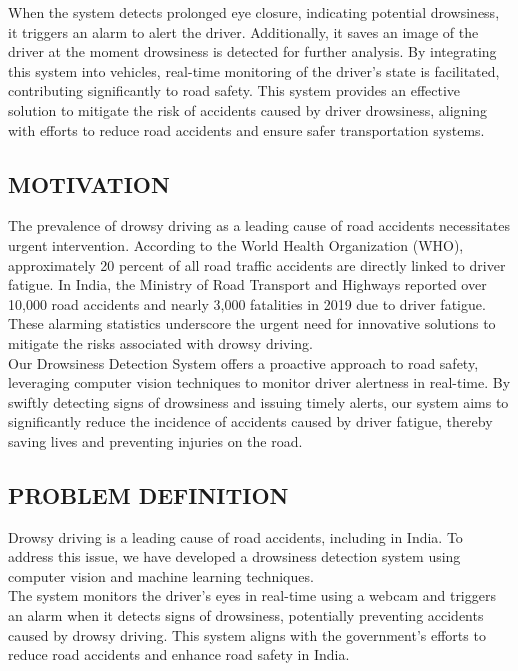 \documentclass[12pt]{article}
\begin{document}
When the system detects prolonged eye closure, indicating potential drowsiness, it triggers an alarm to alert the driver. Additionally, it saves an image of the driver at the moment drowsiness is detected for further analysis. By integrating this system into vehicles, real-time monitoring of the driver's state is facilitated, contributing significantly to road safety. This system provides an effective solution to mitigate the risk of accidents caused by driver drowsiness, aligning with efforts to reduce road accidents and ensure safer transportation systems.
\subsection{MOTIVATION}

The prevalence of drowsy driving as a leading cause of road accidents necessitates urgent intervention. According to the World Health Organization (WHO), approximately 20 percent of all road traffic accidents are directly linked to driver fatigue. In India, the Ministry of Road Transport and Highways reported over 10,000 road accidents and nearly 3,000 fatalities in 2019 due to driver fatigue. These alarming statistics underscore the urgent need for innovative solutions to mitigate the risks associated with drowsy driving. \\
Our Drowsiness Detection System offers a proactive approach to road safety, leveraging computer vision techniques to monitor driver alertness in real-time. By swiftly detecting signs of drowsiness and issuing timely alerts, our system aims to significantly reduce the incidence of accidents caused by driver fatigue, thereby saving lives and preventing injuries on the road.
\subsection{PROBLEM DEFINITION}

Drowsy driving is a leading cause of road accidents, including in India. To address this issue, we have developed a drowsiness detection system using computer vision and machine learning techniques. \\The system monitors the driver's eyes in real-time using a webcam and triggers an alarm when it detects signs of drowsiness, potentially preventing accidents caused by drowsy driving. This system aligns with the government's efforts to reduce road accidents and enhance road safety in India.
\end{document}
